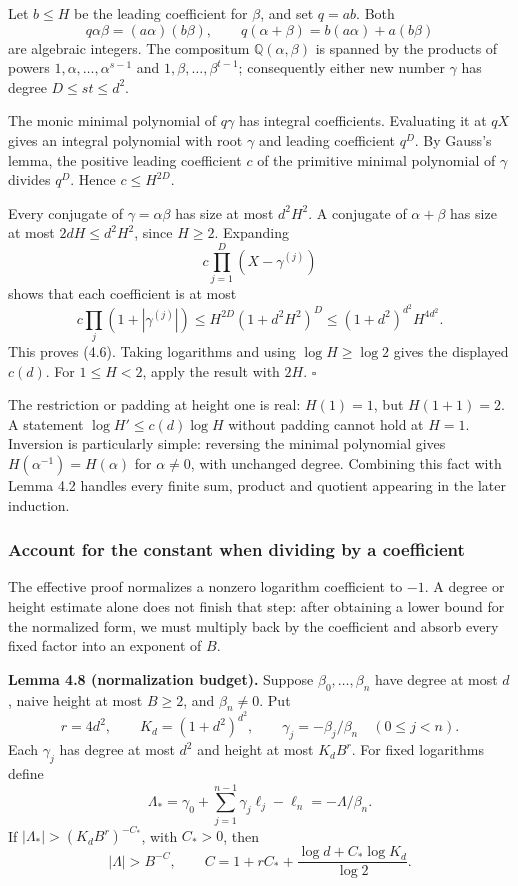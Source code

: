 \documentclass[
  11pt,
  a4paper,
]{article}
\begin{document}
Let \(b\le H\) be the leading coefficient for \(\beta\), and set
\(q=ab\). Both \[
q\alpha\beta=(a\alpha)(b\beta),\qquad
q(\alpha+\beta)=b(a\alpha)+a(b\beta)
\] are algebraic integers. The compositum \(\mathbb Q(\alpha,\beta)\) is
spanned by the products of powers \(1,\alpha,\ldots,\alpha^{s-1}\) and
\(1,\beta,\ldots,\beta^{t-1}\); consequently either new number
\(\gamma\) has degree \(D\le st\le d^2\).

The monic minimal polynomial of \(q\gamma\) has integral coefficients.
Evaluating it at \(qX\) gives an integral polynomial with root
\(\gamma\) and leading coefficient \(q^D\). By Gauss's lemma, the
positive leading coefficient \(c\) of the primitive minimal polynomial
of \(\gamma\) divides \(q^D\). Hence \(c\le H^{2D}\).

Every conjugate of \(\gamma=\alpha\beta\) has size at most \(d^2H^2\). A
conjugate of \(\alpha+\beta\) has size at most \(2dH\le d^2H^2\), since
\(H\ge2\). Expanding \[
c\prod_{j=1}^D(X-\gamma^{(j)})
\] shows that each coefficient is at most \[
c\prod_j(1+|\gamma^{(j)}|)
\le H^{2D}(1+d^2H^2)^D
\le (1+d^2)^{d^2}H^{4d^2}.
\] This proves (4.6). Taking logarithms and using \(\log H\ge\log2\)
gives the displayed \(c(d)\). For \(1\le H<2\), apply the result with
\(2H\). \(\square\)

The restriction or padding at height one is real: \(H(1)=1\), but
\(H(1+1)=2\). A statement \(\log H'\le c(d)\log H\) without padding
cannot hold at \(H=1\). Inversion is particularly simple: reversing the
minimal polynomial gives \(H(\alpha^{-1})=H(\alpha)\) for
\(\alpha\ne0\), with unchanged degree. Combining this fact with Lemma
4.2 handles every finite sum, product and quotient appearing in the
later induction.

\subsubsection{Account for the constant when dividing by a
coefficient}\label{account-for-the-constant-when-dividing-by-a-coefficient}

The effective proof normalizes a nonzero logarithm coefficient to
\(-1\). A degree or height estimate alone does not finish that step:
after obtaining a lower bound for the normalized form, we must multiply
back by the coefficient and absorb every fixed factor into an exponent
of \(B\).

\textbf{Lemma 4.8 (normalization budget).} Suppose
\(\beta_0,\ldots,\beta_n\) have degree at most \(d\), naive height at
most \(B\ge2\), and \(\beta_n\ne0\). Put \[
r=4d^2,\qquad K_d=(1+d^2)^{d^2},\qquad
\gamma_j=-\beta_j/\beta_n\quad(0\le j<n).
\] Each \(\gamma_j\) has degree at most \(d^2\) and height at most
\(K_dB^r\). For fixed logarithms define \[
\Lambda_* =\gamma_0+\sum_{j=1}^{n-1}\gamma_j\ell_j-\ell_n
=-\Lambda/\beta_n.
\] If \(|\Lambda_*|>(K_dB^r)^{-C_*}\), with \(C_*>0\), then \[
|\Lambda|>B^{-C},\qquad
C=1+rC_*+\frac{\log d+C_*\log K_d}{\log2}.
\]
\end{document}

